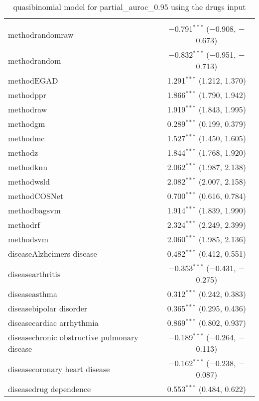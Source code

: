 
\begin{table}[!htbp] \centering 
  \caption{quasibinomial model for partial_auroc_0.95 using the drugs input} 
  \label{} 
\begin{tabular}{@{\extracolsep{5pt}}lc} 
\\[-1.8ex]\hline 
\hline \\[-1.8ex] 
 methodrandomraw & $-$0.791$^{***}$ ($-$0.908, $-$0.673) \\ 
  methodrandom & $-$0.832$^{***}$ ($-$0.951, $-$0.713) \\ 
  methodEGAD & 1.291$^{***}$ (1.212, 1.370) \\ 
  methodppr & 1.866$^{***}$ (1.790, 1.942) \\ 
  methodraw & 1.919$^{***}$ (1.843, 1.995) \\ 
  methodgm & 0.289$^{***}$ (0.199, 0.379) \\ 
  methodmc & 1.527$^{***}$ (1.450, 1.605) \\ 
  methodz & 1.844$^{***}$ (1.768, 1.920) \\ 
  methodknn & 2.062$^{***}$ (1.987, 2.138) \\ 
  methodwsld & 2.082$^{***}$ (2.007, 2.158) \\ 
  methodCOSNet & 0.700$^{***}$ (0.616, 0.784) \\ 
  methodbagsvm & 1.914$^{***}$ (1.839, 1.990) \\ 
  methodrf & 2.324$^{***}$ (2.249, 2.399) \\ 
  methodsvm & 2.060$^{***}$ (1.985, 2.136) \\ 
  diseaseAlzheimers disease & 0.482$^{***}$ (0.412, 0.551) \\ 
  diseasearthritis & $-$0.353$^{***}$ ($-$0.431, $-$0.275) \\ 
  diseaseasthma & 0.312$^{***}$ (0.242, 0.383) \\ 
  diseasebipolar disorder & 0.365$^{***}$ (0.295, 0.436) \\ 
  diseasecardiac arrhythmia & 0.869$^{***}$ (0.802, 0.937) \\ 
  diseasechronic obstructive pulmonary disease & $-$0.189$^{***}$ ($-$0.264, $-$0.113) \\ 
  diseasecoronary heart disease & $-$0.162$^{***}$ ($-$0.238, $-$0.087) \\ 
  diseasedrug dependence & 0.553$^{***}$ (0.484, 0.622) \\ 

\end{tabular}
\end{table}
